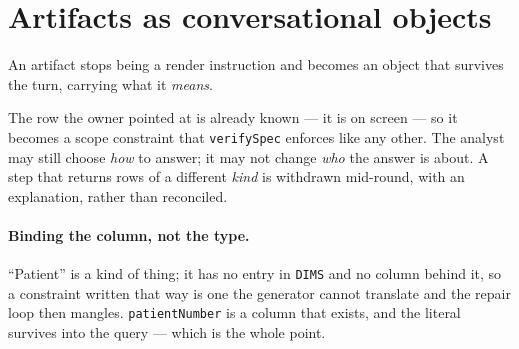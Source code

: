 \documentclass[11pt,a4paper]{report}
\newcommand{\code}[1]{\texttt{\small #1}}
\newenvironment{fitpic}
  {\par\medskip\begin{center}\begin{lrbox}{\fitbox}}
  {\end{lrbox}%
   \ifdim\wd\fitbox>\textwidth \resizebox{\textwidth}{!}{\usebox{\fitbox}}%
   \else \usebox{\fitbox}\fi
   \end{center}\medskip}
\begin{document}
\section{Artifacts as conversational objects}

An artifact stops being a render instruction and becomes an object that survives the turn, carrying
what it \emph{means}.

\begin{fitpic}
\end{fitpic}

\noindent The row the owner pointed at is already known --- it is on screen --- so it becomes a
scope constraint that \code{verifySpec} enforces like any other. The analyst may still choose
\emph{how} to answer; it may not change \emph{who} the answer is about. A step that returns rows of
a different \emph{kind} is withdrawn mid-round, with an explanation, rather than reconciled.

\paragraph{Binding the column, not the type.} ``Patient'' is a kind of thing; it has no entry in
\code{DIMS} and no column behind it, so a constraint written that way is one the generator cannot
translate and the repair loop then mangles. \code{patientNumber} is a column that exists, and the
literal survives into the query --- which is the whole point.
\end{document}

